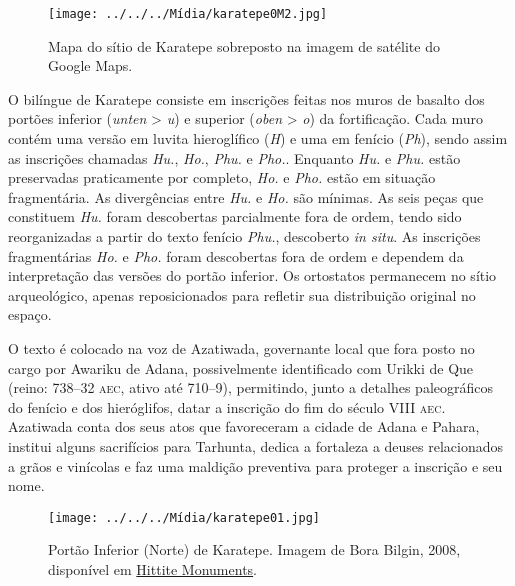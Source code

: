 \begin{figure}[h]
	\begin{center}
		\texttt{[image: ../../../Mídia/karatepe0M2.jpg]}
	\end{center}
	\caption[Mapa do sítio de Karatepe]{Mapa do sítio de Karatepe sobreposto na
		imagem de satélite do Google Maps.}\label{fig:mapa_karatepe}
\end{figure}


O bilíngue de Karatepe consiste em inscrições feitas nos muros de basalto dos
portões inferior (\emph{unten} > \emph{u}) e superior (\emph{oben} > \emph{o})
da fortificação.
Cada muro contém uma versão em luvita hieroglífico (\emph{H}) e uma em fenício
(\emph{Ph}), sendo assim as inscrições chamadas \emph{Hu.}, \emph{Ho.},
\emph{Phu.} e \emph{Pho.}.
Enquanto \emph{Hu.} e \emph{Phu.} estão preservadas praticamente por completo,
\emph{Ho.} e \emph{Pho.} estão em situação fragmentária.
As divergências entre \emph{Hu.} e \emph{Ho.} são mínimas.
As seis peças que constituem \emph{Hu.} foram descobertas parcialmente fora de
ordem, tendo sido reorganizadas a partir do texto fenício \emph{Phu.},
descoberto \emph{in situ}.
As inscrições fragmentárias \emph{Ho.} e \emph{Pho.} foram descobertas fora de
ordem e dependem da interpretação das versões do portão inferior.
Os ortostatos permanecem no sítio arqueológico, apenas reposicionados para
refletir sua distribuição original no espaço.

O texto é colocado na voz de Azatiwada, governante local que fora posto no cargo
por Awariku de Adana, possivelmente identificado com Urikki de Que (reino:
738--32 \textsc{aec}, ativo até 710--9), permitindo, junto a detalhes
paleográficos do fenício e dos hieróglifos, datar a inscrição do fim do século
VIII \textsc{aec}.
Azatiwada conta dos seus atos que favoreceram a cidade de Adana e Pahara,
institui alguns sacrifícios para Tarhunta, dedica a fortaleza a deuses
relacionados a grãos e vinícolas e faz uma maldição preventiva para proteger a
inscrição e seu nome.

\begin{figure}
	\begin{center}
		\texttt{[image: ../../../Mídia/karatepe01.jpg]}
	\end{center}
	\caption[Portão Inferior (Norte) de Karatepe]{Portão Inferior (Norte) de
		Karatepe.
		Imagem de Bora Bilgin, 2008, disponível em
		\href{https://www.hittitemonuments.com/karatepe}{Hittite Monuments}.
	}\label{fig:portaoU}
\end{figure}


